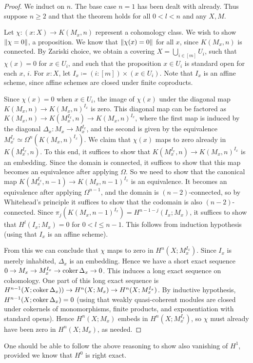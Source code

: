 \begin{proof}
We induct on $n$. The base case $n = 1$ has been dealt with already.
Thus suppose $n \ge 2$ and that the theorem holds for all $0 < l < n$ and
any $X,M$.

Let $\chi : (x : X) \to K(M_x, n)$ represent a cohomology class.
We wish to show $\lVert \chi = 0 \rVert$, a proposition.
We know that $\lVert \chi(x) = 0 \rVert$ for all $x$, since $K(M_x,n)$ is connected.
By Zariski choice, we obtain a covering
$X = \bigcup_{i \in [m]} U_i$,
such that $\chi(x) = 0$ for $x \in U_i$, and
such that the proposition $x \in U_i$ is standard open for each $x$, $i$.
For $x : X$, let $I_x \coloneqq (i : [m]) \times (x \in U_i)$.
Note that $I_x$ is an affine scheme, since affine schemes are closed under finite
coproducts.

Since $\chi(x) = 0$ when $x \in U_i$, the image of $\chi(x)$ under the diagonal
map $K(M_x,n) \to K(M_x,n)^{I_x}$ is zero.
This diagonal map can be factored as $K(M_x,n) \to K(M_x^{I_x},n) \to K(M_x,n)^{I_x}$,
where the first map is induced by the diagonal $\Delta_x : M_x \to M_x^{I_x}$,
and the second is given by the equivalence
$M_x^{I_x} \simeq \Omega^n(K(M_x,n)^{I_x})$.
We claim that $\chi(x)$ maps to zero already in $K(M_x^{I_x},n)$.
To this end, it suffices to show that
$K(M_x^{I_x},n) \to K(M_x,n)^{I_x}$ is an embedding.
Since the domain is connected, it suffices to show that this map becomes
an equivalence after applying $\Omega$.
So we need to show that the canonical map
$K(M_x^{I_x},n-1) \to K(M_x,n-1)^{I_x}$ is an equivalence.
It becomes an equivalence after applying $\Omega^{n-1}$, and
the domain is $(n-2)$-connected, so by Whitehead's principle it suffices 
to show that the codomain is also $(n-2)$-connected.
Since $\pi_j(K(M_x,n-1)^{I_x}) = H^{n-1-j}(I_x;M_x)$,
it suffices to show that $H^l(I_x;M_x) = 0$ for
$0 < l \le n-1$. This follows from induction hypothesis
(using that $I_x$ is an affine scheme).

From this we can conclude that $\chi$ maps to zero in
$H^n(X;M_x^{I_x})$.
Since $I_x$ is merely inhabited, $\Delta_x$ is an embedding.
Hence we have a short exact sequence
$0 \to M_x \to M_x^{I_x} \to \operatorname{coker} \Delta_x \to 0$.
This induces a long exact sequence on cohomology.
One part of this long exact sequence is
$H^{n-1}(X;\operatorname{coker}\Delta_x)) \to H^n(X;M_x) \to H^n(X;M_x^{I_x})$.
By inductive hypothesis, $H^{n-1}(X;\operatorname{coker}\Delta_x) = 0$
(using that weakly quasi-coherent modules are closed under
 cokernels of monomorphisms, finite products, and exponentiation
 with standard opens).
Hence $H^n(X;M_x)$ embeds in $H^n(X;M_x^{I_x})$, so
$\chi$ must already have been zero in $H^n(X;M_x)$, as needed.
\end{proof}

One should be able to follow the above reasoning to show also vanishing of
$H^1$, provided we know that $H^0$ is right exact.

